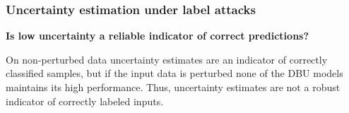 \clearpage
\subsubsection{Uncertainty estimation under label attacks}

\textbf{Is low uncertainty a reliable indicator of correct predictions?}

On non-perturbed data uncertainty estimates are an indicator of correctly classified samples, but if the input data is perturbed none of the DBU models maintains its high performance. Thus, uncertainty estimates are not a robust indicator of correctly labeled inputs. 

\begin{table}[htbp!]
 	\centering
 	\caption{Distinguishing between correctly and wrongly predicted labels based on the differential entropy under PGD label attacks (AUC-PR).}
 	\begin{small}
 	\end{small}
 	\label{tab:conf_label_attack_2}
\end{table}



